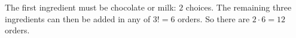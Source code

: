The first ingredient must be chocolate or milk: $2$ choices. The remaining three ingredients can then be added in any of $3!=6$ orders. So there are $2\cdot6=\boxed{12}$ orders.
